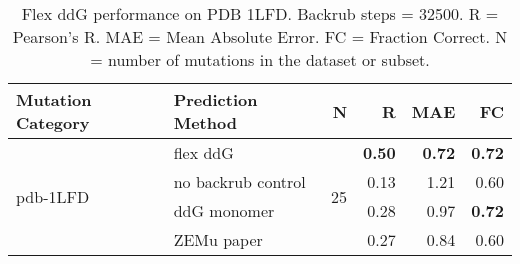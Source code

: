 \begin{table}
  \begin{tabular}{llrrrr}
\toprule
Mutation Category &   Prediction Method &   N &    R &  MAE &   FC \\
\midrule
 \multirow{ 4}{*}{pdb-1LFD} & flex ddG & \multirow{ 4}{*}{25} & \textbf{0.50} & \textbf{0.72} & \textbf{0.72}  \\
 & no backrub control & & 0.13 & 1.21 & 0.60  \\
 & ddG monomer & & 0.28 & 0.97 & \textbf{0.72}  \\
 & ZEMu paper & & 0.27 & 0.84 & 0.60  \\
\bottomrule
\end{tabular}
  \caption[Flex ddG performance on PDB 1LFD]{
    Flex ddG performance on PDB 1LFD. Backrub steps = 32500. R = Pearson's R. MAE = Mean Absolute Error. FC = Fraction Correct. N = number of mutations in the dataset or subset.
  } \label{tab:table-pdb-1LFD}
\end{table}

